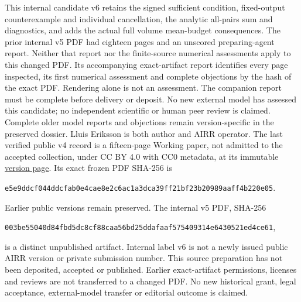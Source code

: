 \documentclass[11pt]{article}
\begin{document}
This internal candidate v6 retains the signed sufficient condition,
fixed-output counterexample and individual cancellation, the analytic all-pairs
sum and diagnostics, and adds the actual full volume mean-budget consequences.
The prior internal v5 PDF had eighteen pages and an unscored preparing-agent
report. Neither that report nor the finite-source numerical assessments apply
to this changed PDF. Its accompanying exact-artifact report identifies every
page inspected, its first numerical assessment and complete objections by the
hash of the exact PDF. Rendering alone is not an assessment. The companion
report must be complete before delivery or deposit. No new external model
has assessed this candidate; no independent scientific or human peer review
is claimed. Complete older model reports and objections remain version-specific
in the preserved dossier.
Lluis Eriksson is both author and AIRR operator. The last verified public v4
record is a fifteen-page Working paper, not admitted to the accepted collection,
under CC BY 4.0 with CC0 metadata, at its immutable
\href{https://airr.science/papers/ARR-2026-7EPM3V3DP796BBRR/versions/v4/}{version page}.
Its exact frozen PDF SHA-256 is
\begin{center}\small\texttt{e5e9ddcf044ddcfab0e4cae8e2c6ac1a3dca39ff21bf23b20989aaff4b220e05}.\end{center}
Earlier public versions remain preserved. The internal v5 PDF, SHA-256
\begin{center}\small\texttt{003be55040d84fbd5dc8cf88caa56bd25ddafaaf575409314e6430521ed4ce61},\end{center}
is a distinct unpublished artifact. Internal label v6 is not a newly issued
public AIRR version or private submission number. This source preparation has
not been deposited, accepted or published. Earlier exact-artifact permissions,
licenses and reviews are not transferred to a changed PDF. No new historical
grant, legal acceptance, external-model transfer or editorial outcome is claimed.
\end{document}
